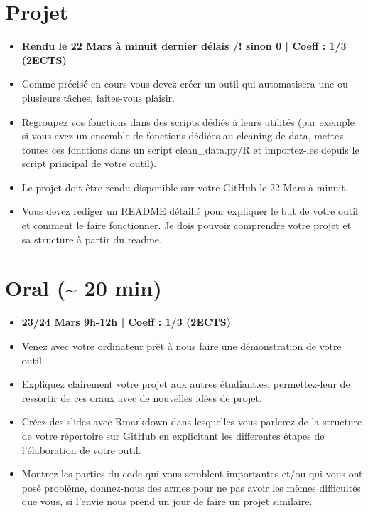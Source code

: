 \documentclass[
]{article}
\begin{document}
\hypertarget{projet}{%
\section{Projet}\label{projet}}

\begin{itemize}
\item
  \textbf{Rendu le 22 Mars à minuit dernier délais /! sinon 0 | Coeff : 1/3 (2ECTS)}
\item
  Comme précisé en cours vous devez créer un outil qui automatisera une
  ou plusieurs tâches, faites-vous plaisir.
\item
  Regroupez vos fonctions dans des scripts dédiés à leurs utilités (par
  exemple si vous avez un ensemble de fonctions dédiées au cleaning de
  data, mettez toutes ces fonctions dans un script clean\_data.py/R et
  importez-les depuis le script principal de votre outil).
\item
  Le projet doit être rendu disponible sur votre GitHub le 22 Mars à
  minuit.
\item
  Vous devez rediger un README détaillé pour expliquer le but de votre
  outil et comment le faire fonctionner. Je dois pouvoir comprendre
  votre projet et sa structure à partir du readme.
\end{itemize}

\hypertarget{oral-20-min}{%
\section{Oral (\textasciitilde{} 20 min)}\label{oral-20-min}}

\begin{itemize}
\item
  \textbf{23/24 Mars 9h-12h | Coeff : 1/3 (2ECTS)}
\item
  Venez avec votre ordinateur prêt à nous faire une démonstration de
  votre outil.
\item
  Expliquez clairement votre projet aux autres étudiant.es,
  permettez-leur de ressortir de ces oraux avec de nouvelles idées de
  projet.
\item
  Créez des slides avec Rmarkdown dans lesquelles vous parlerez de la
  structure de votre répertoire sur GitHub en explicitant les
  differentes étapes de l'élaboration de votre outil.
\item
  Montrez les parties du code qui vous semblent importantes et/ou qui
  vous ont posé problème, donnez-nous des armes pour ne pas avoir les
  mêmes difficultés que vous, si l'envie nous prend un jour de faire un
  projet similaire.
\end{itemize}
\end{document}
